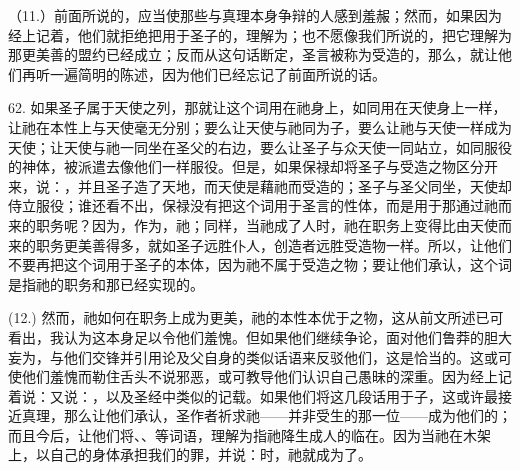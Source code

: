 （11.）前面所说的，应当使那些与真理本身争辩的人感到羞赧；然而，如果因为经上记着，他们就拒绝把用于圣子的，理解为；也不愿像我们所说的，把它理解为那更美善的盟约已经成立；反而从这句话断定，圣言被称为受造的，那么，就让他们再听一遍简明的陈述，因为他们已经忘记了前面所说的话。\par

62. 如果圣子属于天使之列，那就让这个词用在祂身上，如同用在天使身上一样，让祂在本性上与天使毫无分别；要么让天使与祂同为子，要么让祂与天使一样成为天使；让天使与祂一同坐在圣父的右边，要么让圣子与众天使一同站立，如同服役的神体，被派遣去像他们一样服役。但是，如果保禄却将圣子与受造之物区分开来，说：，并且圣子造了天地，而天使是藉祂而受造的；圣子与圣父同坐，天使却侍立服役；谁还看不出，保禄没有把这个词用于圣言的性体，而是用于那通过祂而来的职务呢？因为，作为，祂；同样，当祂成了人时，祂在职务上变得比由天使而来的职务更美善得多，就如圣子远胜仆人，创造者远胜受造物一样。所以，让他们不要再把这个词用于圣子的本体，因为祂不属于受造之物；要让他们承认，这个词是指祂的职务和那已经实现的。\par

(12.) 然而，祂如何在职务上成为更美，祂的本性本优于之物，这从前文所述已可看出，我认为这本身足以令他们羞愧。但如果他们继续争论，面对他们鲁莽的胆大妄为，与他们交锋并引用论及父自身的类似话语来反驳他们，这是恰当的。这或可使他们羞愧而勒住舌头不说邪恶，或可教导他们认识自己愚昧的深重。因为经上记着说：又说：，以及圣经中类似的记载。如果他们将这几段话用于子，这或许最接近真理，那么让他们承认，圣作者祈求祂——并非受生的那一位——成为他们的；而且今后，让他们将、、等词语，理解为指祂降生成人的临在。因为当祂在木架上，以自己的身体承担我们的罪，并说：时，祂就成为了。\par

